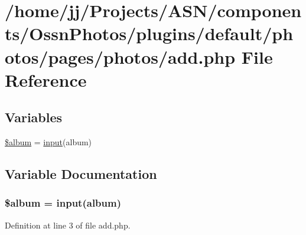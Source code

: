 \hypertarget{components_2_ossn_photos_2plugins_2default_2photos_2pages_2photos_2add_8php}{}\section{/home/jj/\+Projects/\+A\+S\+N/components/\+Ossn\+Photos/plugins/default/photos/pages/photos/add.php File Reference}
\label{components_2_ossn_photos_2plugins_2default_2photos_2pages_2photos_2add_8php}
\subsection*{Variables}
\begin{DoxyCompactItemize}
\item 
\hyperlink{components_2_ossn_photos_2plugins_2default_2photos_2pages_2photos_2add_8php_ac40a9764673b6d86593dc674331c5116}{\$album} = \hyperlink{ossn_8lib_8input_8php_a64ebee98b041c4f75f71ed3cd73cc8ed}{input}(\textquotesingle{}album\textquotesingle{})
\end{DoxyCompactItemize}


\subsection{Variable Documentation}
\subsubsection[{\texorpdfstring{\$album}{$album}}]{\setlength{\rightskip}{0pt plus 5cm}\$album = {\bf input}(\textquotesingle{}album\textquotesingle{})}\hypertarget{components_2_ossn_photos_2plugins_2default_2photos_2pages_2photos_2add_8php_ac40a9764673b6d86593dc674331c5116}{}\label{components_2_ossn_photos_2plugins_2default_2photos_2pages_2photos_2add_8php_ac40a9764673b6d86593dc674331c5116}


Definition at line 3 of file add.\+php.

